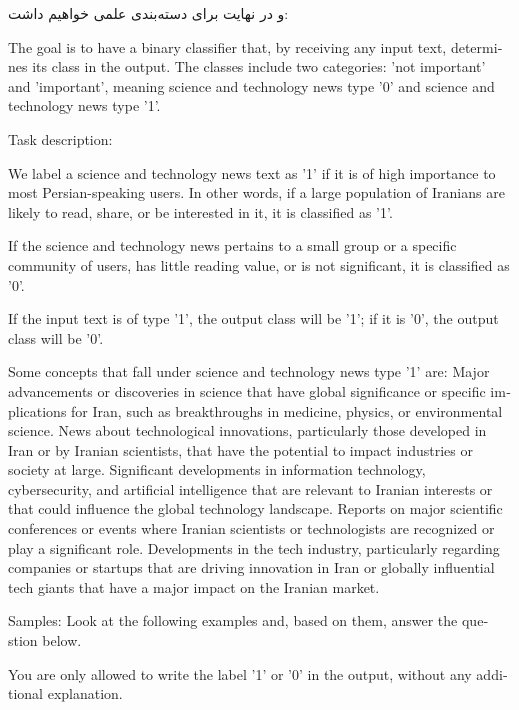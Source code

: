 و در نهایت برای دسته‌‌بندی علمی خواهیم داشت:

\vspace{5pt}
\begin{scriptsize}
\begin{itshape}
\begin{latin}
\LTR
The goal is to have a binary classifier that, by receiving any input text, determines its class in the output. The classes include two categories: 'not important' and 'important', meaning science and technology news type '0' and science and technology news type '1'.

Task description:

We label a science and technology news text as '1' if it is of high importance to most Persian-speaking users. In other words, if a large population of Iranians are likely to read, share, or be interested in it, it is classified as '1'.

If the science and technology news pertains to a small group or a specific community of users, has little reading value, or is not significant, it is classified as '0'.

If the input text is of type '1', the output class will be '1'; if it is '0', the output class will be '0'.

Some concepts that fall under science and technology news type '1' are:
Major advancements or discoveries in science that have global significance or specific implications for Iran, such as breakthroughs in medicine, physics, or environmental science.
News about technological innovations, particularly those developed in Iran or by Iranian scientists, that have the potential to impact industries or society at large.
Significant developments in information technology, cybersecurity, and artificial intelligence that are relevant to Iranian interests or that could influence the global technology landscape.
Reports on major scientific conferences or events where Iranian scientists or technologists are recognized or play a significant role.
Developments in the tech industry, particularly regarding companies or startups that are driving innovation in Iran or globally influential tech giants that have a major impact on the Iranian market.

Samples: Look at the following examples and, based on them, answer the question below.

You are only allowed to write the label '1' or '0' in the output, without any additional explanation.
\RTL
\end{latin}
\end{itshape}
\end{scriptsize}
\vspace{5pt}

